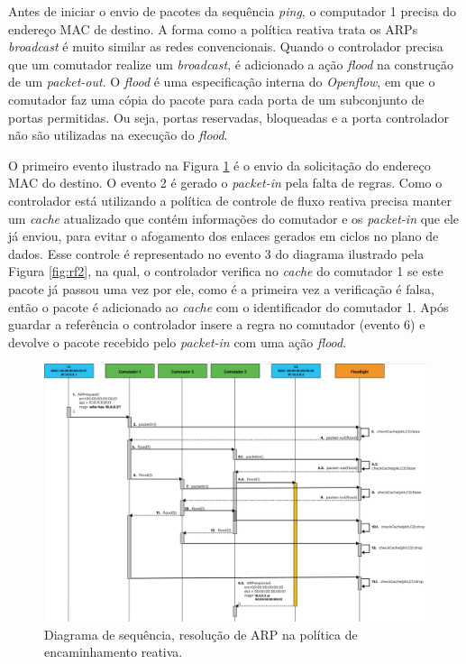 Antes de iniciar o envio de pacotes da sequência \textit{ping}, o computador 1 precisa do endereço MAC de destino. A forma como a política reativa trata os ARPs \textit{broadcast} é muito similar as redes convencionais. Quando o controlador precisa que um comutador realize um \emph{broadcast}, é adicionado a ação \emph{flood} na construção de um \emph{packet-out}. O \textit{flood} é uma especificação interna do \textit{Openflow}, em que o comutador faz uma cópia do pacote para cada porta de um subconjunto de portas permitidas. Ou seja, portas reservadas, bloqueadas e a porta controlador não são utilizadas na execução do \emph{flood}. 

O primeiro evento ilustrado na Figura \ref{fig:rf1} é o envio da solicitação do endereço MAC do destino. O evento 2 é gerado o \textit{packet-in} pela falta de regras. Como o controlador está utilizando a política de controle de fluxo reativa precisa manter um  \emph{cache} atualizado que contém informações do comutador e os \textit{packet-in} que ele já enviou, para evitar o afogamento dos enlaces gerados em ciclos no plano de dados. Esse controle é representado no evento 3 do diagrama ilustrado pela Figura \ref{fig:rf2}, na qual, o controlador verifica no \textit{cache} do comutador 1 se este pacote já passou uma vez por ele, como é a primeira vez a verificação é falsa, então o pacote é adicionado ao \textit{cache} com o identificador do comutador 1. Após guardar a referência o controlador insere a regra no comutador (evento 6) e devolve o pacote recebido pelo \emph{packet-in} com uma ação \emph{flood}.

\begin{figure}[htb!]
	\caption{\label{fig:rf1} Diagrama de sequência, resolução de ARP na política de encaminhamento reativa.} 
	\begin{center}
	    \includegraphics[scale=0.43]{imagens/rf.jpg}
	\end{center}
\end{figure}

